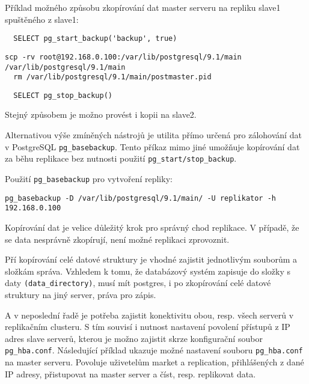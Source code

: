 Příklad možného způsobu zkopírování dat master serveru na repliku slave1 spuštěného z slave1:
\begin{lstlisting}
  SELECT pg_start_backup('backup', true)
\end{lstlisting}
\begin{lstlisting}[keywordstyle=\bfseries\color{purpurova7},identifierstyle=\color{black},stringstyle=\color{black}]
  scp -rv root@192.168.0.100:/var/lib/postgresql/9.1/main /var/lib/postgresql/9.1/main
  rm /var/lib/postgresql/9.1/main/postmaster.pid
\end{lstlisting}
\begin{lstlisting}
  SELECT pg_stop_backup()
\end{lstlisting}

Stejný způsobem je možno provést i kopii na slave2. 

Alternativou výše zmíněných nástrojů je utilita přímo určená pro zálohování dat v PostgreSQL \texttt{pg\_basebackup}. Tento příkaz mimo jiné umožňuje kopírování dat za běhu replikace bez nutnosti použití \texttt{pg\_start/stop\_backup}.

Použití \texttt{pg\_basebackup} pro vytvoření repliky:
\begin{lstlisting}[keywordstyle=\bfseries\color{purpurova7},identifierstyle=\color{black},stringstyle=\color{black}]
  pg_basebackup -D /var/lib/postgresql/9.1/main/ -U replikator -h 192.168.0.100
\end{lstlisting}

Kopírování dat je velice důležitý krok pro správný chod replikace. V případě, že se data nesprávně zkopírují, není možné replikaci zprovoznit. 

Pří kopírování celé datové struktury je vhodné zajistit jednotlivým souborům a složkám správa. Vzhledem k tomu, že databázový systém zapisuje do složky s daty \texttt{(data\_directory)}, musí mít postgres, i po zkopírování celé datové struktury na jiný server, práva pro zápis.

A v neposlední řadě je potřeba zajistit konektivitu obou, resp. všech serverů v replikačním clusteru. S tím souvisí i nutnost nastavení povolení přístupů z IP adres slave serverů, kterou je možno zajistit skrze konfigurační soubor \texttt{pg\_hba.conf}. Následující příklad ukazuje možné nastavení souboru \texttt{pg\_hba.conf} na master serveru. Povoluje uživetelům market a replication, přihlášených z dané IP adresy, přistupovat na master server a číst, resp. replikovat data.

